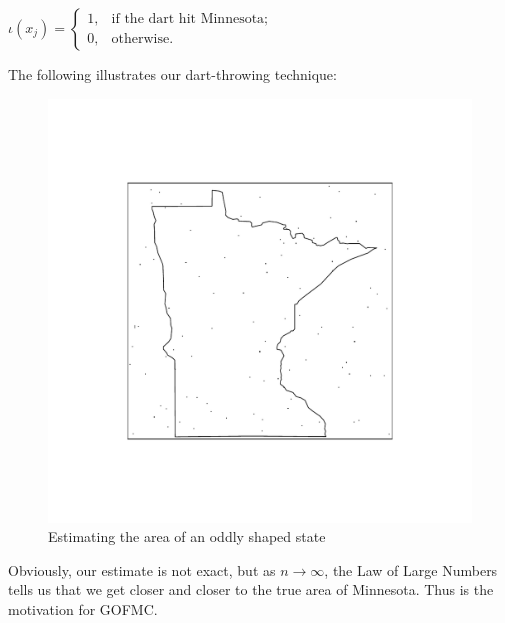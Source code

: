 \documentclass[12pt,twoside]{reedthesis}
\begin{document}
			\begin{center}
		 	$\iota(x_j) = 
			\begin{cases} 1, & \text{if the dart hit Minnesota}; \\
			0, & \text{otherwise}. \end{cases}$
			 \end {center}
			The following illustrates our dart-throwing technique:
			
			\begin{figure}[h]
		       	\centering
		    	\includegraphics[clip=true, viewport=.3in 1in 6in 6in,scale=0.5]{mn_box_pts}
		     	\caption{Estimating the area of an oddly shaped state}
	 		\label{subd}
			\end{figure}	

			Obviously, our estimate is not exact, but as $n \rightarrow \infty$, the Law of Large Numbers tells us that we get closer and closer to the true area of Minnesota. Thus is the motivation for GOFMC.
\end{document}
